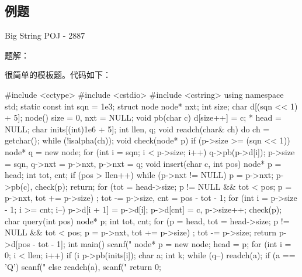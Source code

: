 \subsection{例题}

Big String POJ - 2887

题解：

很简单的模板题。代码如下：

\begin{cppcode}
#include <cctype>
#include <cstdio>
#include <cstring>
using namespace std;
static const int sqn = 1e3;
struct node {
  node* nxt;
  int size;
  char d[(sqn << 1) + 5];
  node() { size = 0, nxt = NULL; }
  void pb(char c) { d[size++] = c; }
}* head = NULL;
char inits[(int)1e6 + 5];
int llen, q;
void readch(char& ch) {
  do
    ch = getchar();
  while (!isalpha(ch));
}
void check(node* p) {
  if (p->size >= (sqn << 1)) {
    node* q = new node;
    for (int i = sqn; i < p->size; i++) q->pb(p->d[i]);
    p->size = sqn, q->nxt = p->nxt, p->nxt = q;
  }
}
void insert(char c, int pos) {
  node* p = head;
  int tot, cnt;
  if (pos > llen++) {
    while (p->nxt != NULL) p = p->nxt;
    p->pb(c), check(p);
    return;
  }
  for (tot = head->size; p != NULL && tot < pos; p = p->nxt, tot += p->size)
    ;
  tot -= p->size, cnt = pos - tot - 1;
  for (int i = p->size - 1; i >= cnt; i--) p->d[i + 1] = p->d[i];
  p->d[cnt] = c, p->size++;
  check(p);
}
char query(int pos) {
  node* p;
  int tot, cnt;
  for (p = head, tot = head->size; p != NULL && tot < pos;
       p = p->nxt, tot += p->size)
    ;
  tot -= p->size;
  return p->d[pos - tot - 1];
}
int main() {
  scanf("%
  node* p = new node;
  head = p;
  for (int i = 0; i < llen; i++) {
    if (i %
    p->pb(inits[i]);
  }
  char a;
  int k;
  while (q--) {
    readch(a);
    if (a == 'Q')
      scanf("%
    else
      readch(a), scanf("%
  }
  return 0;
}
\end{cppcode}
